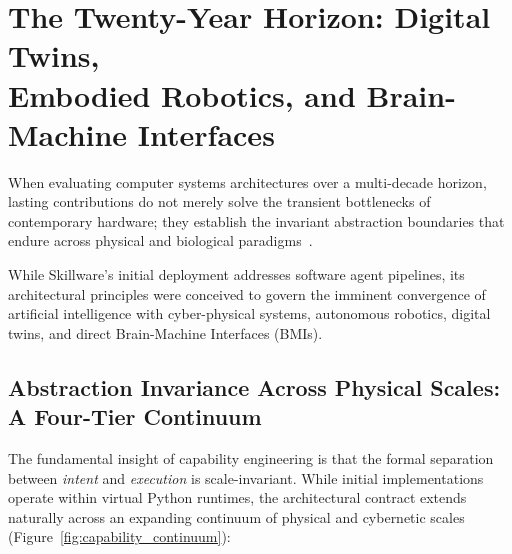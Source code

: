 
\section[The Twenty-Year Horizon: Digital Twins, Embodied Robotics, and BMIs]{The Twenty-Year Horizon: Digital Twins,\texorpdfstring{\\}{ }Embodied Robotics, and Brain-Machine Interfaces}
\label{sec:embodied_bmi_horizon}

When evaluating computer systems architectures over a multi-decade horizon, lasting contributions do not merely solve the transient bottlenecks of contemporary hardware; they establish the invariant abstraction boundaries that endure across physical and biological paradigms~\cite{parnas1972criteria, lampson1974protection}. 

While Skillware's initial deployment addresses software agent pipelines, its architectural principles were conceived to govern the imminent convergence of artificial intelligence with cyber-physical systems, autonomous robotics, digital twins, and direct Brain-Machine Interfaces (BMIs).

\subsection{Abstraction Invariance Across Physical Scales: A Four-Tier Continuum}
\label{subsec:four_phases}

The fundamental insight of capability engineering is that the formal separation between \emph{intent} and \emph{execution} is scale-invariant. While initial implementations operate within virtual Python runtimes, the architectural contract extends naturally across an expanding continuum of physical and cybernetic scales (Figure~\ref{fig:capability_continuum}):

